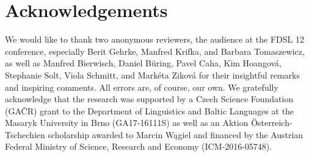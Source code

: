 \documentclass[output=paper,modfonts,hidelinks,newtxmath
\ChapterDOI{10.5281/zenodo.2545513}
]{langscibook}
\begin{document}
\section*{Acknowledgements}
We would like to thank two anonymous reviewers, the audience at the FDSL 12 conference, especially Berit Gehrke, Manfred Krifka, and Barbara Tomaszewicz, as well as Manfred Bierwisch, Daniel Büring, Pavel Caha, Kim Hoangová, Stepha\-nie Solt, Viola Schmitt, and Markéta Ziková for their insightful remarks and inspiring comments. All errors are, of course, our own. We gratefully acknowledge that the research was supported by a Czech Science Foundation (GAČR) grant to the Department of Linguistics and Baltic Languages at the Masaryk University in Brno (GA17-16111S) as well as an Aktion Österreich-Tschechien scholarship awarded to Marcin Wągiel and financed by the Austrian Federal Ministry of Science, Research and Economy (ICM-2016-05748).

\sloppy
\printbibliography[heading=subbibliography,notkeyword=this]
\end{document}
